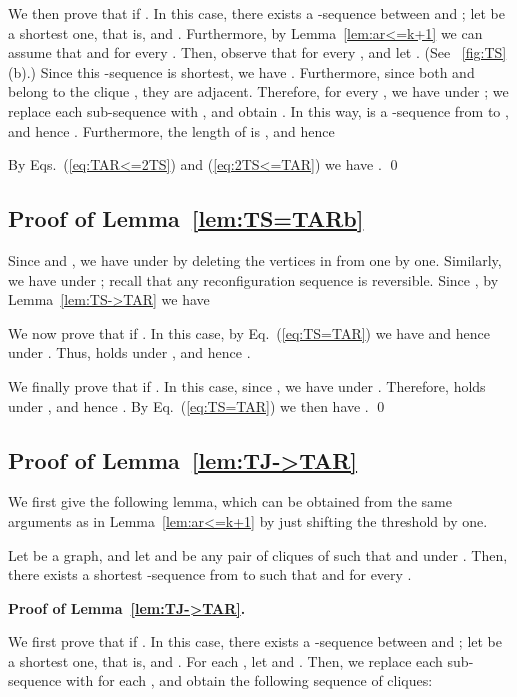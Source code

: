 \documentclass{llncs}
\newcounter{one}
\begin{document}
	We then prove that  if .
	In this case, there exists a -sequence between  and ; 
let  be a shortest one, that is,  and .
	Furthermore, by Lemma~\ref{lem:ar<=k+1} we can assume that  and  for every . 
	Then, observe that  for every , and let .
(See \figurename~\ref{fig:TS}(b).)
	Since this -sequence  is shortest, we have .
	Furthermore, since both  and  belong to the clique , they are adjacent.
	Therefore, for every , we have  under ;
we replace each sub-sequence  with , and obtain .
	In this way,  is a -sequence from  to , and hence . 
	Furthermore, the length of  is , and hence 
	

	By Eqs.~(\ref{eq:TAR<=2TS}) and (\ref{eq:2TS<=TAR}) we have .
	\qed



	
	\subsection{Proof of Lemma~\ref{lem:TS=TARb}}
Since  and , we have  under  by deleting the vertices in  from  one by one. 
	Similarly, we have  under ;
recall that any reconfiguration sequence is reversible.
	Since , by Lemma~\ref{lem:TS->TAR} we have 
	

	We now prove that  if .
	In this case, by Eq.~(\ref{eq:TS=TAR}) we have  and hence  under .
	Thus,  holds under , and hence . 
	
	We finally prove that  if .
	In this case, since , we have  under .
	Therefore,  holds under , and hence . 
	By Eq.~(\ref{eq:TS=TAR}) we then have .
\qed





	\subsection{Proof of Lemma~\ref{lem:TJ->TAR}}
	
	We first give the following lemma, which can be obtained from the same arguments as in Lemma~\ref{lem:ar<=k+1} by just shifting the threshold by one.	
	\begin{lemma} \label{lem:ar<=k}
	Let  be a graph, and let  and  be any pair of cliques of  such that  and  under .
	Then, there exists a shortest -sequence  from  to  such that  and  for every .
	\end{lemma}


	\noindent
	{\bf Proof of Lemma~\ref{lem:TJ->TAR}.}

We first prove that  if .
	In this case, there exists a -sequence between  and ; 
let  be a shortest one, that is,  and .
	For each , let  and . 
	Then, we replace each sub-sequence  with  for each , and obtain the following sequence  of cliques:
	
\end{document}
